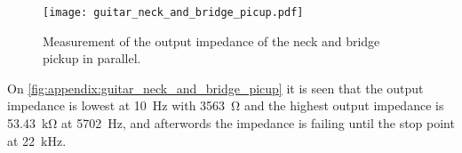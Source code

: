 \begin{figure}[htbp!]
	\centering
		\texttt{[image: guitar\_neck\_and\_bridge\_picup.pdf]}
		\caption{Measurement of the output impedance of the neck and bridge pickup in parallel.}
		\label{fig:appendix:guitar_neck_and_bridge_picup}
\end{figure}

On  \autoref{fig:appendix:guitar_neck_and_bridge_picup} it is seen that the output impedance is lowest at \SI{10}{\hertz} with \SI{3563}{\ohm}  and the highest output impedance is \SI{53,43}{\kilo\ohm} at \SI{5702}{\hertz}, and afterwords the impedance is failing until the stop point at \SI{22}{\kilo\hertz}.